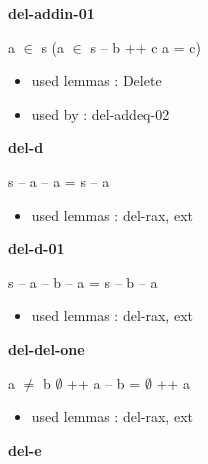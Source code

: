 \documentclass[a4paper]{article}
\begin{document}
{\large\bf del-addin-01}

\medskip

 \Fol \Not a $\in$ s \Imp (a $\in$ s -- b ++ c \Equiv a = c)

\begin{itemize}


\item       used lemmas  : Delete
\item       used by      : del-addeq-02

\end{itemize}

\medskip

\bigskip

{\large\bf del-d}

\medskip

 \Fol s -- a -- a = s -- a

\begin{itemize}


\item       used lemmas  : del-rax, ext

\end{itemize}

\medskip

\bigskip

{\large\bf del-d-01}

\medskip

 \Fol s -- a -- b -- a = s -- b -- a

\begin{itemize}


\item       used lemmas  : del-rax, ext

\end{itemize}

\medskip

\bigskip

{\large\bf del-del-one}

\medskip

 \Fol a $\neq$ b \Imp $\emptyset$ ++ a -- b = $\emptyset$ ++ a

\begin{itemize}


\item       used lemmas  : del-rax, ext

\end{itemize}

\medskip

\bigskip

{\large\bf del-e}

\medskip
\end{document}

